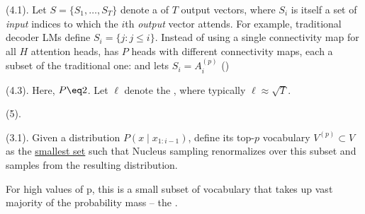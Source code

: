 \documentclass[11pt]{article}
\begin{document}
 (4.1). Let $S = \{S_1, \ldots, S_T\}$ denote a  of $T$ output vectors, where $S_i$ is itself a set of \textit{input} indices to which the $i$th \textit{output} vector attends. For example, traditional decoder LMs define $S_i = \{j : j \le i\}$. Instead of using a single connectivity map for all $H$ attention heads,  has $P$ heads with different connectivity maps, each a subset of the traditional one:
and lets $S_i = A_i^{(p)}$ ()


 (4.3). Here, $P \eq 2$.  Let $\ell$ denote the , where typically $\ell \approx \sqrt{T}$. 


 (5). 





 (3.1). Given a distribution $P(x \mid x_{1:i-1})$, define its top-$p$ vocabulary $V^{(p)} \subset V$ as the \underline{smallest set} such that 
Nucleus sampling renormalizes over this subset and samples from the resulting distribution. 
\begin{myquote}
	For high values of p, this is a small subset of vocabulary that takes up vast majority of the probability mass -- the .
\end{myquote}
\end{document}
